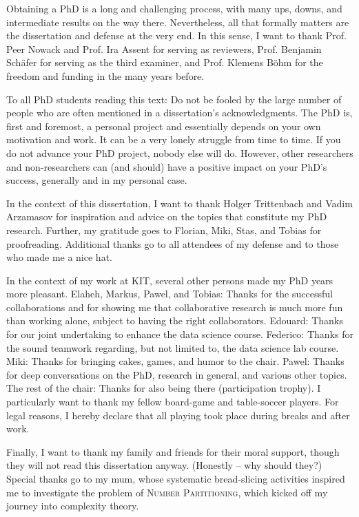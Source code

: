 Obtaining a PhD is a long and challenging process, with many ups, downs, and intermediate results on the way there.
Nevertheless, all that formally matters are the dissertation and defense at the very end.
In this sense, I want to thank Prof. Peer Nowack and Prof. Ira Assent for serving as reviewers, Prof. Benjamin Schäfer for serving as the third examiner, and Prof. Klemens Böhm for the freedom and funding in the many years before.

To all PhD students reading this text:
Do not be fooled by the large number of people who are often mentioned in a dissertation's acknowledgments.
The PhD is, first and foremost, a personal project and essentially depends on your own motivation and work.
It can be a very lonely struggle from time to time.
If you do not advance your PhD project, nobody else will do.
However, other researchers and non-researchers can (and should) have a positive impact on your PhD's success, generally and in my personal case.

In the context of this dissertation, I want to thank Holger Trittenbach and Vadim Arzamasov for inspiration and advice on the topics that constitute my PhD research.
Further, my gratitude goes to Florian, Miki, Stas, and Tobias for proofreading.
Additional thanks go to all attendees of my defense and to those who made me a nice hat.

In the context of my work at KIT, several other persons made my PhD years more pleasant.
Elaheh, Markus, Pawel, and Tobias: Thanks for the successful collaborations and for showing me that collaborative research is much more fun than working alone, subject to having the right collaborators.
Edouard: Thanks for our joint undertaking to enhance the data science course.
Federico: Thanks for the sound teamwork regarding, but not limited to, the data science lab course.
Miki: Thanks for bringing cakes, games, and humor to the chair.
Pawel: Thanks for deep conversations on the PhD, research in general, and various other topics.
The rest of the chair: Thanks for also being there (participation trophy).
I particularly want to thank my fellow board-game and table-soccer players.
For legal reasons, I hereby declare that all playing took place during breaks and after work.

Finally, I want to thank my family and friends for their moral support, though they will not read this dissertation anyway.
(Honestly -- why should they?)
Special thanks go to my mum, whose systematic bread-slicing activities inspired me to investigate the problem of \textsc{Number Partitioning}, which kicked off my journey into complexity theory.
